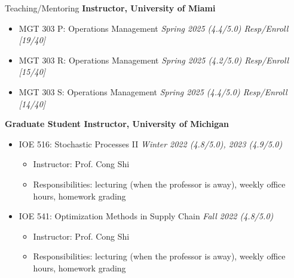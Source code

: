 \documentclass{resume}
\begin{document}
\begin{rSection}{Teaching/Mentoring} 
{\bf Instructor, University of Miami}
\begin{itemize}
    \item MGT 303 P: Operations Management \hfill {\em Spring 2025 (4.4/5.0) Resp/Enroll [19/40]}
    \item MGT 303 R: Operations Management \hfill {\em Spring 2025 (4.2/5.0) Resp/Enroll [15/40]}
    \item MGT 303 S: Operations Management \hfill {\em Spring 2025 (4.4/5.0) Resp/Enroll [14/40]}
\end{itemize}
{\bf Graduate Student Instructor, University of Michigan}
\begin{itemize}
        \item IOE 516: Stochastic Processes II \hfill {\em Winter 2022 (4.8/5.0), 2023 (4.9/5.0)}
        \begin{itemize}
            \item Instructor: Prof. Cong Shi
            \item Responsibilities: lecturing (when the professor is away), weekly office hours, homework grading
            
        \end{itemize}
        \item IOE 541:  Optimization Methods in Supply Chain \hfill {\em Fall 2022 (4.8/5.0)}
        \begin{itemize}
            \item Instructor: Prof. Cong Shi
            \item Responsibilities: lecturing (when the professor is away), weekly office hours, homework grading
            

\end{itemize}
\end{itemize}
\end{rSection}
\end{document}
